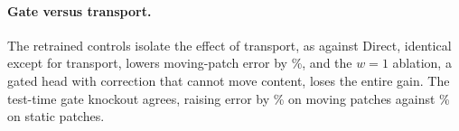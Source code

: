 \paragraph{Gate versus transport.} The retrained controls isolate the effect of transport, as against Direct, identical
except for transport, \ours{} lowers moving-patch error by \droidMovingVsDirect\%, and the $w{=}1$ ablation, a gated head
with correction that cannot move content, loses the entire gain.
%
The test-time gate knockout agrees, raising error by \koMoving\% on moving patches against \koStatic\% on static patches.

